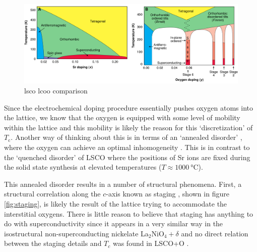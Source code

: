\begin{figure}
    \centering
    \includegraphics[width=\textwidth]{fig/intro/phases_wells.png}
    \caption[lsco lcoo comparison]{lsco lcoo comparison \cite{Wells1997}}
    \label{fig:phase_wells}
\end{figure}

Since the electrochemical doping procedure essentially pushes oxygen atoms into the lattice, we know that the oxygen is equipped with some level of mobility within the lattice and this mobility is likely the reason for this `discretization' of $T_\text{c}$. Another way of thinking about this is in terms of an `annealed disorder' \cite{Wells1997}, where the oxygen can achieve an optimal inhomogeneity \cite{Poccia2012}. This is in contrast to the `quenched disorder' \cite{Wells1997} of LSCO where the positions of Sr ions are fixed during the solid state synthesis at elevated temperatures ($T \approx \SI{1000}{\celsius}$). 

This annealed disorder results in a number of structural phenomena. First, a structural correlation along the $c$-axis known as staging \cite{Wells1996}, shown in figure \ref{fig:staging}, is likely the result of the lattice trying to accommodate the interstitial oxygens. There is little reason to believe that staging has anything to do with superconductivity since it appears in a very similar way in the isostructural non-superconducting nickelate La$_2$NiO$_4+\delta$ \cite{Tranquada1994} and no direct relation between the staging details and $T_c$ was found in LSCO+O \cite{ray2017}.

